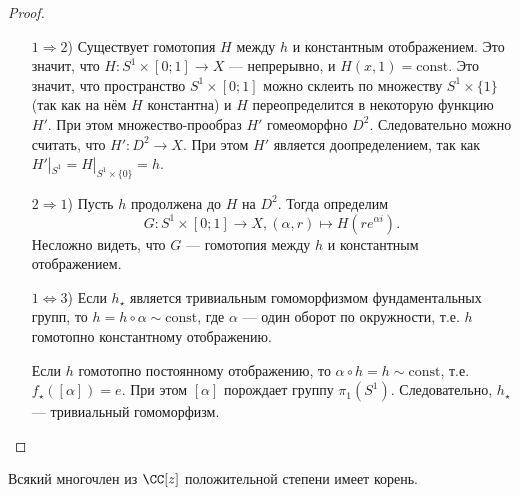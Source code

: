 \documentclass[12pt,a4paper]{article}
\newcommand{\const}{\ensuremath{\mathrm{const}}\xspace}
\begin{document}
    \begin{proof}
        \begin{itemize}
            \item[$1 \Rightarrow 2$)] Существует гомотопия $H$ между $h$ и константным отображением. Это значит, что $H: S^1 \times [0; 1] \to X$ --- непрерывно, и $H(x, 1) = \const$. Это значит, что пространство $S^1 \times [0; 1]$ можно склеить по множеству $S^1 \times \{1\}$ (так как на нём $H$ константна) и $H$ переопределится в некоторую функцию $H'$. При этом множество-прообраз $H'$ гомеоморфно $D^2$. Следовательно можно считать, что $H': D^2 \to X$. При этом $H'$ является доопределением, так как $H'|_{S^1} = H|_{S^1 \times \{0\}} = h$.
            \item[$2 \Rightarrow 1$)] Пусть $h$ продолжена до $H$ на $D^2$. Тогда определим
                \[G: S^1 \times [0; 1] \to X, (\alpha, r) \mapsto H(r e^{\alpha i}).\]
                Несложно видеть, что $G$ --- гомотопия между $h$ и константным отображением.
            \item[$1 \Leftrightarrow 3$)] Если $h_\star$ является тривиальным гомоморфизмом фундаментальных групп, то $h = h \circ \alpha \sim \const$, где $\alpha$ --- один оборот по окружности, т.е. $h$ гомотопно константному отображению.

                Если $h$ гомотопно постоянному отображению, то $\alpha \circ h = h \sim \const$, т.е. $f_\star([\alpha]) = e$. При этом $[\alpha]$ порождает группу $\pi_1(S^1)$. Следовательно, $h_\star$ --- тривиальный гомоморфизм.
        \end{itemize}
    \end{proof}

    \begin{theorem}
        Всякий многочлен из $\CC[z]$ положительной степени имеет корень.
    \end{theorem}
\end{document}
